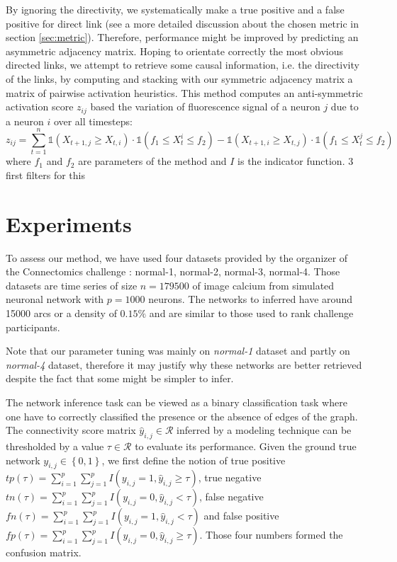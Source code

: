 \documentclass[wcp]{jmlr}
\begin{document}
By ignoring the directivity, we systematically make a true positive and a
false positive for direct link (see a more detailed discussion about the
chosen metric in section \ref{sec:metric}). Therefore, performance might be
improved by predicting an asymmetric adjacency matrix. Hoping to orientate
correctly the most obvious directed links, we attempt to retrieve some causal
information, i.e. the directivity of the links, by computing and stacking with
our symmetric adjacency matrix a matrix of pairwise activation heuristics.
This method computes an anti-symmetric activation score $z_{ij}$ based the
variation of fluorescence signal of a neuron $j$ due to a neuron $i$ over all
timesteps: \[ z_{ij} = \sum_{t=1}^n \mathbb{1}(X_{t+1,j} \ge X_{t, i}) \cdot
\mathbb{1}(f_1\le X_t^i \le f_2) -  \mathbb{1}(X_{t+1,i} \ge X_{t, j}) \cdot
\mathbb{1}(f_1 \le X_t^j \le f_2) \]  where $f_1$ and $f_2$ are parameters of
the method and $I$ is the indicator function. %
3 first filters for this


\section{Experiments}

To assess our method, we have used four datasets provided by the organizer
of the Connectomics challenge : normal-1, normal-2, normal-3, normal-4. Those
datasets are time series of size $n=179500$ of image calcium from simulated
neuronal network \cite{stetter2012model} with $p=1000$ neurons. The networks
to inferred have around 15000 arcs or a density of $0.15\%$ and are similar to those
used to rank challenge participants.

Note that our parameter tuning was mainly on \textit{normal-1} dataset and
partly on \textit{normal-4} dataset, therefore it may justify why these
networks are better retrieved despite the fact that some might be simpler to
infer.

The network inference task can be viewed as a binary classification task
where one have to correctly classified the presence or the absence of edges
of the graph. The connectivity score matrix
$\hat{y}_{i,j} \in \mathcal{R}$ inferred by a modeling technique
can be thresholded by a value $\tau \in \mathcal{R}$ to evaluate its performance.
Given the ground true network $y_{i,j} \in \left\{0, 1\right\}$, we first define the notion of
true positive $tp(\tau) = \sum_{i=1}^p \sum_{j=1}^p I(y_{i,j} = 1, \hat{y}_{i,j} \geq \tau)$,
true negative $tn(\tau) = \sum_{i=1}^p \sum_{j=1}^p I(y_{i,j} = 0, \hat{y}_{i,j} < \tau)$,
false negative $fn(\tau) = \sum_{i=1}^p \sum_{j=1}^p I(y_{i,j} = 1, \hat{y}_{i,j} < \tau)$ and
false positive $fp(\tau) = \sum_{i=1}^p \sum_{j=1}^p I(y_{i,j} = 0, \hat{y}_{i,j} \geq \tau)$.
Those four numbers formed the confusion matrix.
\end{document}
